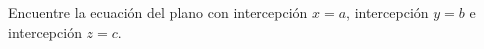 \item Encuentre la ecuación del plano con intercepción $x = a$, intercepción $y = b$ e intercepción $z = c$.
